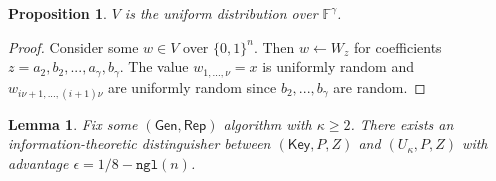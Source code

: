 \documentclass[11pt]{article}
\newcommand{\class}[1]{{\ensuremath{\mathsf{#1}}}}
\newcommand{\Key}{\ensuremath{\class{Key}}\xspace}
\newcommand{\gen}{\ensuremath{\class{Gen}}\xspace}
\newcommand{\rep}{\ensuremath{\class{Rep}}\xspace}
\newcommand{\zo}{\ensuremath{\{0, 1\}}}
\newcommand{\ngl}{\ensuremath{\mathtt{ngl}}\xspace}
\newtheorem{lemma}[theorem]{Lemma}
\newtheorem{proposition}[theorem]{Proposition}
\begin{document}
\begin{proposition}\label{prop:dist uniform fuzz}
$V$ is the uniform distribution over $\mathbb{F}^\gamma$.
\end{proposition}
\begin{proof}
Consider some $w\in V$ over $\zo^n$.  Then $w\leftarrow W_z$ for coefficients $z=a_2, b_2, ..., a_\gamma , b_\gamma$.  The value $w_{1,...,\nu} =x $ is uniformly random and $w_{i\nu+1,...,(i+1)\nu}$ are uniformly random since $b_2,..., b_\gamma$ are random.
\end{proof}

\begin{lemma}
\label{lem:fuzz can't get key}
Fix some $(\gen, \rep)$ algorithm with $\kappa \ge 2$.  There exists an information-theoretic distinguisher between $(\Key, P, Z)$ and $(U_\kappa, P, Z)$ with advantage $\epsilon = 1/8-\ngl(n)$.
\end{lemma}
\end{document}
